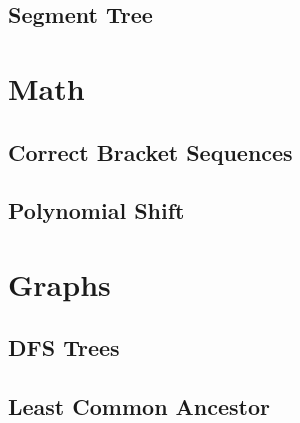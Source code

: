 \documentclass[12pt]{article}
\begin{document}
\subsection{Segment Tree} 


\section{Math}

\subsection{Correct Bracket Sequences} 
\subsection{Polynomial Shift} 


\section{Graphs}

\subsection{DFS Trees} 
\subsection{Least Common Ancestor} 
\end{document}
